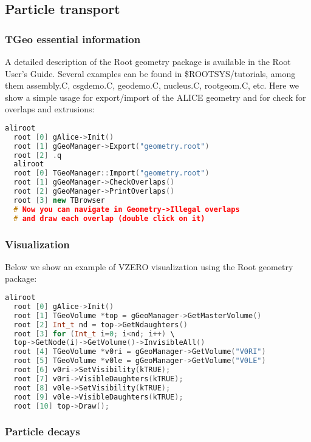 \documentclass[12pt,a4paper,twoside]{article}
\begin{document}
\subsection{Particle transport}

\subsubsection{TGeo essential information}

A detailed description of the Root geometry package is available in
the Root User's Guide\cite{RootUsersGuide}. Several examples can be
found in \$ROOTSYS/tutorials, among them assembly.C, csgdemo.C,
geodemo.C, nucleus.C, rootgeom.C, etc. Here we show a simple usage for
export/import of the ALICE geometry and for check for overlaps and
extrusions:

\begin{lstlisting}[language=C++]
  aliroot
  root [0] gAlice->Init()
  root [1] gGeoManager->Export("geometry.root")
  root [2] .q
  aliroot
  root [0] TGeoManager::Import("geometry.root")
  root [1] gGeoManager->CheckOverlaps()
  root [2] gGeoManager->PrintOverlaps()
  root [3] new TBrowser
  # Now you can navigate in Geometry->Illegal overlaps
  # and draw each overlap (double click on it)
\end{lstlisting}

\subsubsection{Visualization}

Below we show an example of VZERO visualization using the Root
geometry package:

\begin{lstlisting}[language=C++]
  aliroot
  root [0] gAlice->Init()
  root [1] TGeoVolume *top = gGeoManager->GetMasterVolume()
  root [2] Int_t nd = top->GetNdaughters()
  root [3] for (Int_t i=0; i<nd; i++) \
  top->GetNode(i)->GetVolume()->InvisibleAll()
  root [4] TGeoVolume *v0ri = gGeoManager->GetVolume("V0RI")
  root [5] TGeoVolume *v0le = gGeoManager->GetVolume("V0LE")
  root [6] v0ri->SetVisibility(kTRUE);
  root [7] v0ri->VisibleDaughters(kTRUE);
  root [8] v0le->SetVisibility(kTRUE);
  root [9] v0le->VisibleDaughters(kTRUE);
  root [10] top->Draw();

\end{lstlisting}

\subsubsection{Particle decays}
\end{document}
